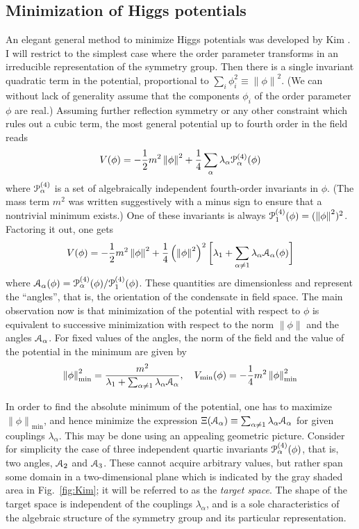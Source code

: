\documentclass[final,2p,times,12pt,sort&compress]{elsarticle}
\newcommand\PP{\EuScript{P}}                %
\newcommand\AP{\EuScript{A}}                %
\newcommand\nor[1]{\left\|#1\right\|}       %
\begin{document}
\subsection{Minimization of Higgs potentials}
An elegant general method to minimize Higgs potentials was developed by Kim
\cite{Kim:1981xu}. I will restrict to the simplest case where the order
parameter transforms in an irreducible representation of the symmetry group.
Then there is a single invariant quadratic term in the potential, proportional
to $\sum_i\phi_i^2\equiv\nor\phi^2$. (We can without lack of generality assume
that the components $\phi_i$ of the order parameter $\phi$ are real.) Assuming
further reflection symmetry or any other constraint which rules out a cubic
term, the most general potential up to fourth order in the field reads
\begin{equation}
V(\phi)=-\frac12m^2\nor\phi^2+\frac14\sum_\alpha\lambda_\alpha
\PP^{(4)}_\alpha(\phi)
\label{GLpot}
\end{equation}
where $\PP_\alpha^{(4)}$ is a set of algebraically independent fourth-order
invariants in $\phi$. (The mass term $m^2$ was written suggestively with a
minus sign to ensure that a nontrivial minimum exists.) One of these invariants
is always $\PP^{(4)}_1(\phi)=(\nor\phi^2)^2$. Factoring it out, one gets
\begin{equation}
V(\phi)=-\frac12m^2\nor\phi^2+\frac14\left(\nor\phi^2\right)^2
\biggl[\lambda_1+\sum_{\alpha\neq1}\lambda_\alpha\AP_\alpha(\phi)\biggr]
\end{equation}
where $\AP_\alpha(\phi)=\PP^{(4)}_\alpha(\phi)/\PP^{(4)}_1(\phi)$. These
quantities are dimensionless and represent the ``angles'', that is, the
orientation of the condensate in field space. The main observation now is that
minimization of the potential with respect to $\phi$ is equivalent to
successive minimization with respect to the norm $\nor\phi$ and the angles
$\AP_\alpha$. For fixed values of the angles, the norm of the field and the
value of the potential in the minimum are given by
\begin{equation}
\nor\phi^2_{\text{min}}=\frac{m^2}{\lambda_1+\sum_{\alpha\neq1}
\lambda_\alpha\AP_\alpha},\quad
V_{\text{min}}(\phi)=-\frac14m^2\nor\phi^2_{\text{min}}
\label{kimaux}
\end{equation}

In order to find the absolute minimum of the potential, one has to maximize
$\nor\phi_{\text{min}}$, and hence minimize the expression
$\Xi(\AP_\alpha)\equiv\sum_{\alpha\neq1}\lambda_\alpha\AP_\alpha$ for given
couplings $\lambda_\alpha$. This may be done using an appealing geometric
picture. Consider for simplicity the case of three independent quartic
invariants $\PP_\alpha^{(4)}(\phi)$, that is, two angles, $\AP_2$ and $\AP_3$.
These cannot acquire arbitrary values, but rather span some domain in a
two-dimensional plane which is indicated by the gray shaded area in
Fig.~\ref{fig:Kim}; it will be referred to as the \emph{target space}. The shape
of the target space is independent of the couplings $\lambda_\alpha$,
and is a sole characteristics of the algebraic structure of the symmetry group
and its particular representation.
\end{document}
